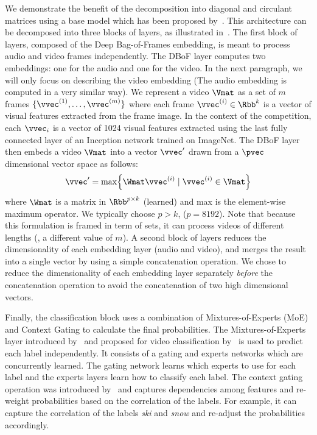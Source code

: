 We demonstrate the benefit of the decomposition into diagonal and circulant matrices using a base model which has been proposed by~\citet{miech2017learnable}.
This architecture can be decomposed into three blocks of layers, as illustrated in~. 
The first block of layers, composed of the Deep Bag-of-Frames embedding, is meant to process audio and video frames independently.
The DBoF layer computes two embeddings: one for the audio and one for the video.
In the next paragraph, we will only focus on describing the video embedding (The audio embedding is computed in a very similar way).
We represent a video $\Vmat$ as a set of $m$ frames $\{\vvec^{(1)}, \ldots, \vvec^{(m)}\}$ where each frame $\vvec^{(i)} \in \Rbb^k$ is a vector of visual features extracted from the frame image.
In the context of the \yt competition, each $\vvec_i$ is a vector of 1024 visual features extracted using the last fully connected layer of an Inception network trained on ImageNet.
The DBoF layer then embeds a video $\Vmat$ into a vector $\vvec'$ drawn from a $\pvec$ dimensional vector space as follows:
\begin{equation}
  \vvec' = \max \left\{\Wmat \vvec^{(i)} \mid \vvec^{(i)} \in \Vmat \right\}
\end{equation}
where $\Wmat$ is a matrix in $\Rbb^{p \times k}$ (learned) and max is the element-wise maximum operator.
We typically choose $p > k$, (\eg $p = 8192$).
Note that because this formulation is framed in term of sets, it can process videos of different lengths (\ie, a different value of $m$).
A second block of layers reduces the dimensionality of each embedding layer (audio and video), and merges the result into a single vector by using a simple concatenation operation.
We chose to reduce the dimensionality of each embedding layer separately \emph{before} the concatenation operation to avoid the concatenation of two high dimensional vectors.

Finally, the classification block uses a combination of Mixtures-of-Experts (MoE) and Context Gating to calculate the final probabilities.
The Mixtures-of-Experts layer introduced by~\citet{jordan1993hierarchical} and proposed for video classification by~\citet{abu2016youtube} is used to predict each label independently.
It consists of a gating and experts networks which are concurrently learned.
The gating network learns which experts to use for each label and the experts layers learn how to classify each label.
The context gating operation was introduced by~\citet{miech2017learnable} and captures dependencies among features and re-weight probabilities based on the correlation of the labels.
For example, it can capture the correlation of the labels \emph{ski} and \emph{snow} and re-adjust the probabilities accordingly. 



